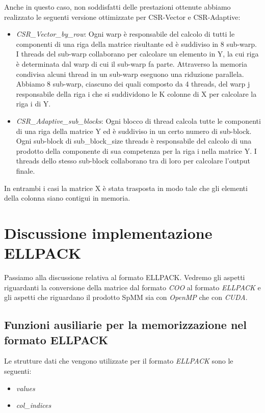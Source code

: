 \documentclass{article}
\begin{document}
Anche in questo caso, non soddisfatti delle prestazioni ottenute abbiamo realizzato le seguenti versione ottimizzate per CSR-Vector e CSR-Adaptive:
  \begin{itemize}
   \item \textit{CSR\_Vector\_by\_row}: 
    Ogni warp è responsabile del calcolo di tutti le componenti di una riga della matrice risultante ed è suddiviso in 8 sub-warp. I threads del sub-warp collaborano per calcolare un elemento in Y, la cui riga è determinata dal warp di cui il sub-warp fa parte. Attraverso la memoria condivisa alcuni thread in un sub-warp eseguono una riduzione parallela. Abbiamo 8 sub-warp, ciascuno dei quali composto da 4 threads, del warp j responsabile della riga i che si suddividono le K colonne di X per calcolare la riga i di Y.    
   \item \textit{CSR\_Adaptive\_sub\_blocks}: Ogni blocco di thread calcola tutte le componenti di una riga della matrice Y ed è suddiviso in un certo numero di sub-block. Ogni sub-block di sub\_block\_size threads è responsabile del calcolo di una prodotto della componente di sua competenza per la riga i nella matrice Y.  I threads dello stesso sub-block collaborano tra di loro per calcolare l'output finale.
   \end{itemize}

In entrambi i casi la matrice X è stata trasposta in modo tale che gli elementi della colonna siano contigui in memoria.

\section{Discussione implementazione ELLPACK}
Passiamo alla discussione relativa al formato ELLPACK. Vedremo gli aspetti riguardanti la conversione della matrice dal formato \textit{COO} al formato \textit{ELLPACK} e gli aspetti che riguardano il prodotto SpMM sia con \textit{OpenMP} che con \textit{CUDA}.

\subsection{Funzioni ausiliarie per la memorizzazione nel formato ELLPACK}
Le strutture dati che vengono utilizzate per il formato \textit{ELLPACK} sono le seguenti:

\begin{itemize}
\item \textit{values}
\item \textit{col\_indices}
\end{itemize}
\end{document}
